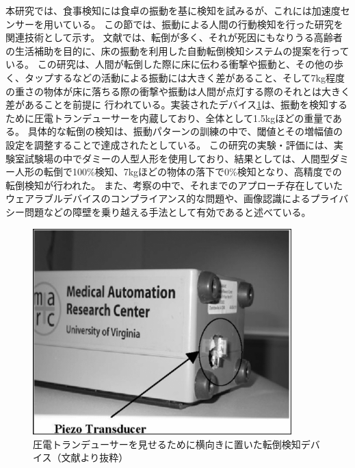 本研究では、食事検知には食卓の振動を基に検知を試みるが、これには加速度センサーを用いている。
この節では、振動による人間の行動検知を行った研究を関連技術として示す。
文献\cite{floor_vibration_fall_detector}では、転倒が多く、それが死因にもなりうる高齢者の生活補助を目的に、床の振動を利用した自動転倒検知システムの提案を行っている。
この研究は、人間が転倒した際に床に伝わる衝撃や振動と、その他の歩く、タップするなどの活動による振動には大きく差があること、そして7kg程度の重さの物体が床に落ちる際の衝撃や振動は人間が点灯する際のそれとは大きく差があることを前提に
行われている。実装されたデバイス\ref{fig:floor_vibration_fall_detector}は、振動を検知するために圧電トランデューサーを内蔵しており、全体として1.5kgほどの重量である。
具体的な転倒の検知は、振動パターンの訓練の中で、閾値とその増幅値の設定を調整することで達成されたとしている。
この研究の実験・評価には、実験室試験場の中でダミーの人型人形を使用しており、結果としては、人間型ダミー人形の転倒で100\%検知、7kgほどの物体の落下で0\%検知となり、高精度での転倒検知が行われた。
また、考察の中で、それまでのアプローチ存在していたウェアラブルデバイスのコンプライアンス的な問題や、画像認識によるプライバシー問題などの障壁を乗り越える手法として有効であると述べている。

\begin{figure}[htbp]
  \caption{圧電トランデューサーを見せるために横向きに置いた転倒検知デバイス（文献\cite{floor_vibration_fall_detector}より抜粋）}
  \label{fig:floor_vibration_fall_detector}
  \begin{center}
    \includegraphics[bb=0 0 1000 800,width=10cm]{assets/floor_vibration_fall_detector.png}
  \end{center}
\end{figure}

